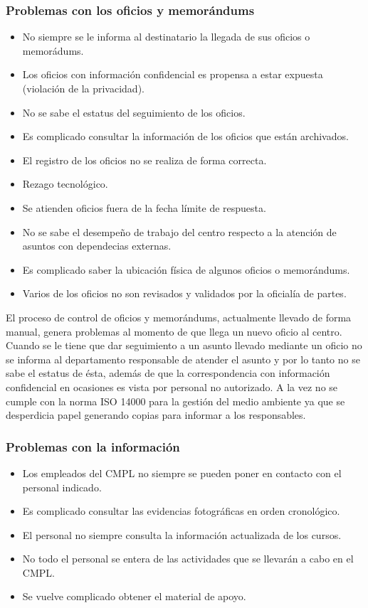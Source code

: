 		\subsubsection{Problemas con los oficios y memorándums}
\begin{itemize}
	\item No siempre se le informa al destinatario la llegada de sus oficios o memorádums.
	\item Los oficios con información confidencial es propensa a estar expuesta (violación de la privacidad).
	\item No se sabe el estatus del seguimiento de los oficios.
	\item Es complicado consultar la información de los oficios que están archivados.
	\item El registro de los oficios no se realiza de forma correcta.
	\item Rezago tecnológico.
	\item Se atienden oficios fuera de la fecha límite de respuesta.
	\item No se sabe el desempeño de trabajo del centro respecto a la atención de asuntos con dependecias externas.
	\item Es complicado saber la ubicación física de algunos oficios o memorándums.
	\item Varios de los oficios no son revisados y validados por la oficialía de partes.
	\end{itemize}
El proceso de control de oficios y memorándums, actualmente llevado de forma manual, genera problemas al momento de que llega un nuevo oficio al centro. Cuando se le tiene que dar seguimiento a un asunto llevado mediante un oficio no se informa al departamento responsable de atender el asunto y por lo tanto no se sabe el estatus de ésta, además de que la correspondencia con información confidencial en ocasiones es vista por personal no autorizado. A la vez no se cumple con la norma ISO 14000 para la gestión del medio ambiente ya que se desperdicia papel generando copias para informar a los responsables.

		\subsubsection{Problemas con la información}
\begin{itemize}
	
	\item Los empleados del CMPL no siempre se pueden poner en contacto con el personal indicado.
	\item Es complicado consultar las evidencias fotográficas en orden cronológico.
	\item El personal no siempre consulta la información actualizada de los cursos.
	\item No todo el personal se entera de las actividades que se llevarán a cabo en el CMPL.
	\item Se vuelve complicado obtener el material de apoyo.	
	
\end{itemize}

